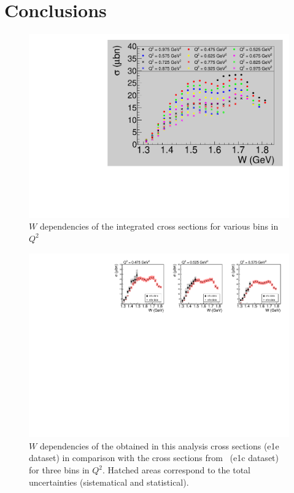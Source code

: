 \chapter{Conclusions}

\begin{figure}[htp]
\begin{center}
\includegraphics[width=12cm]{pictures/sys_err/all_q2.pdf}
\caption{\small $W$ dependencies of the integrated cross sections for various bins in $Q^{2}$}
\label{fig:all_q2}
\end{center}
\end{figure}


\begin{figure}[htp]
\begin{center}
\includegraphics[width=12cm]{pictures/conclusions/e1e_e1c.pdf}
\caption{\small $W$ dependencies of the obtained in this analysis  cross sections (e1e dataset) in comparison with the cross sections from~\cite{Fedotov:2008aa} (e1c dataset) for three bins in $Q^{2}$. Hatched areas correspond to the total uncertainties (sistematical and statistical).}
\label{fig:e1e_e1c}
\end{center}
\end{figure}


